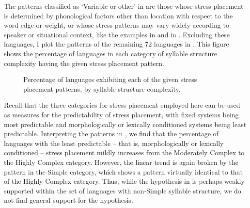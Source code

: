   The patterns classified as ‘Variable or other’ in  are those whose stress placement is determined by phonological factors other than location with respect to the word edge or weight, or whose stress patterns may vary widely according to speaker or situational context, like the examples in  and  in . Excluding these languages, I plot the patterns of the remaining 72 languages in . This figure shows the percentage of languages in each category of syllable structure complexity having the given stress placement pattern.

\begin{figure}
\caption{\label{fig:5.1}Percentage of languages exhibiting each of the given stress placement patterns, by syllable structure complexity.}
\end{figure}

  Recall that the three categories for stress placement employed here can be used as measures for the predictability of stress placement, with fixed systems being most predictable and morphologically or lexically conditioned systems being least predictable. Interpreting the patterns in , we find that the percentage of languages with the least predictable -- that is, morphologically or lexically conditioned -- stress placement mildly increases from the Moderately Complex to the Highly Complex category. However, the linear trend is again broken by the pattern in the Simple category, which shows a pattern virtually identical to that of the Highly Complex category. Thus, while the hypothesis in  is perhaps weakly supported within the set of languages with non-Simple syllable structure, we do not find general support for the hypothesis.

